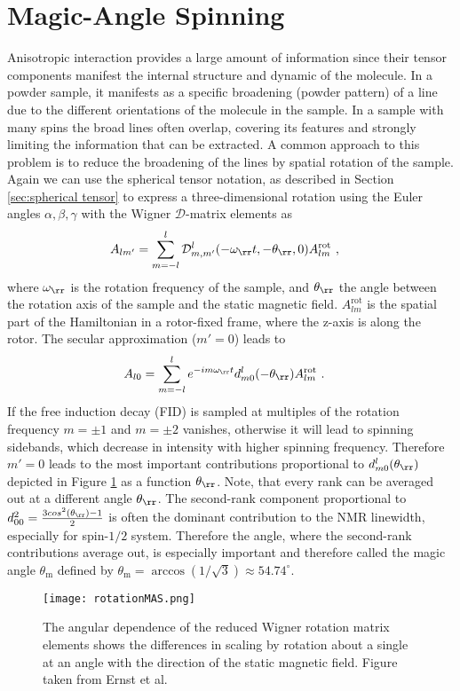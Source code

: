 \section{Magic-Angle Spinning}
Anisotropic interaction provides a large amount of information since their tensor components manifest the internal structure and dynamic of the molecule. In a powder sample, it manifests as a specific broadening (powder pattern) of a line due to the different orientations of the molecule in the sample. In a sample with many spins the broad lines often overlap, covering its features and strongly limiting the information that can be extracted.
A common approach to this problem is to reduce the broadening of the lines by spatial rotation of the sample.
Again we can use the spherical tensor notation, as described in Section \ref{sec:spherical tensor} to express a three-dimensional rotation using the Euler angles $\alpha, \beta, \gamma$ with the Wigner $\mathcal{D}$-matrix elements as 
\begin{align}
  A_{l m'} &= \sum_{m=-l}^{l}\mathcal{D}^{l}_{m,m'}(-\omega_{\rr} t,-\theta_{\rr},0) A^{\text{rot}}_{lm}~,
\end{align}
where $\omega_{\rr}$ is the rotation frequency of the sample, and $\theta_{\rr}$ the angle between the rotation axis of the sample and the static magnetic field. $A^{\text{rot}}_{lm}$ is the spatial part of the Hamiltonian in a rotor-fixed frame, where the z-axis is along the rotor. The secular approximation ($m'= 0$) leads to
\begin{align}
    A_{l 0} &=\sum_{m=-l}^{l} e^{-i m \omega_{\rr} t }d_{m 0}^{l}(-\theta_{\rr})A^{\text{rot}}_{lm}~.
\end{align}
If the free induction decay (FID) is sampled at multiples of the rotation frequency $m = \pm 1$ and $m = \pm 2$ vanishes, otherwise it will lead to spinning sidebands, which decrease in intensity with higher spinning frequency. Therefore $m'=0$ leads to the most important contributions proportional to $d_{m 0}^{l}(\theta_{\rr})$ depicted in Figure \ref{fig:d-spinning}  as a function $\theta_{\rr}$. Note, that every rank can be averaged out at a different angle $\theta_{\rr}$. The second-rank component proportional to
$
  d^2_{00}= \frac{3cos^2(\theta_{\rr})-1}{2}
$
is often the dominant contribution to the NMR linewidth, especially for spin-$1/2$ system. Therefore the angle, where the second-rank contributions average out, is especially important and therefore called the magic angle $\theta_{\mathrm{m}}$ defined by $\theta_\mathrm{m}=\arccos\left(1/\sqrt 3 \right)\approx 54.74^\circ$.
\begin{figure}[h]
  \centering
  \texttt{[image: rotationMAS.png]}
  \caption{The angular dependence of the reduced Wigner rotation matrix elements
 shows the differences in scaling by rotation about a single at an angle with the direction of the static magnetic field. Figure taken from Ernst et al. \cite{Script}}
  \label{fig:d-spinning}
\end{figure}

